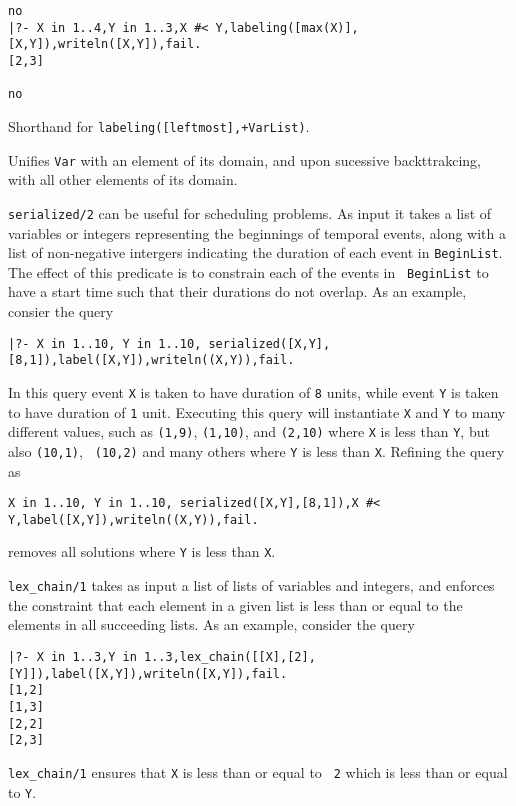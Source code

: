 \begin{description}
\begin{itemize}
{\begin{verbatim}
no
|?- X in 1..4,Y in 1..3,X #< Y,labeling([max(X)],[X,Y]),writeln([X,Y]),fail.
[2,3]

no
\end{verbatim}
}
\end{itemize}

%
Shorthand for {\tt labeling([leftmost],+VarList)}.

%
Unifies {\tt Var} with an element of its domain, and upon sucessive
backttrakcing, with all other elements of its domain.

% 
{\tt serialized/2} can be useful for scheduling problems.  As input it
takes a list of variables or integers representing the beginnings of
temporal events, along with a list of non-negative intergers
indicating the duration of each event in {\tt BeginList}.  The effect
of this predicate is to constrain each of the events in {\tt
  BeginList} to have a start time such that their durations do not
overlap.  As an example, consier the query
%
{\small
\begin{verbatim}
|?- X in 1..10, Y in 1..10, serialized([X,Y],[8,1]),label([X,Y]),writeln((X,Y)),fail.
\end{verbatim}
}
%
In this query event {\tt X} is taken to have duration of {\tt 8}
units, while event {\tt Y} is taken to have duration of {\tt 1} unit.
Executing this query will instantiate {\tt X} and {\tt Y} to many
different values, such as {\tt (1,9)}, {\tt (1,10)}, and {\tt (2,10)}
where {\tt X} is less than {\tt Y}, but also {\tt (10,1)}, {\tt
  (10,2)} and many others where {\tt Y} is less than {\tt X}.  Refining the query as
%
{\small
\begin{verbatim}
X in 1..10, Y in 1..10, serialized([X,Y],[8,1]),X #< Y,label([X,Y]),writeln((X,Y)),fail.
\end{verbatim}
}
%
removes all solutions where {\tt Y} is less than {\tt X}.

%
{\tt lex\_chain/1} takes as input a list of lists of variables and
integers, and enforces the constraint that each element in a given
list is less than or equal to the elements in all succeeding lists.
As an example, consider the query
%
{\small
\begin{verbatim}
|?- X in 1..3,Y in 1..3,lex_chain([[X],[2],[Y]]),label([X,Y]),writeln([X,Y]),fail.
[1,2]
[1,3]
[2,2]
[2,3]
\end{verbatim}
}
%
{\tt lex\_chain/1} ensures that {\tt X} is less than or equal to {\tt
  2} which is less than or equal to {\tt Y}.


\end{description}

